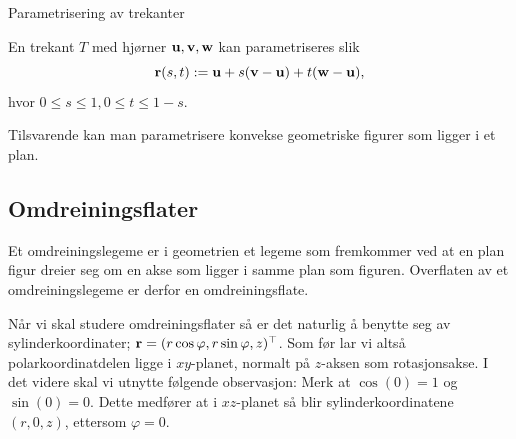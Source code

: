 \begin{eks}{Parametrisering av trekanter}\mbox{}\label{ex:trekant_para}\\
\begin{minipage}{7cm}
En trekant $T$ med hjørner $\mathbf{u},\mathbf{v},\mathbf{w}$ kan parametriseres slik
\[\mathbf{r}(s,t):=\mathbf{u}+s(\mathbf{v}-\mathbf{u})+t(\mathbf{w}-\mathbf{u}),\]
hvor $ 0\leq s\leq 1, 0\leq t\leq 1-s$.

Tilsvarende kan man parametrisere konvekse geometriske figurer som ligger i et plan.
\end{minipage}
\begin{minipage}{7cm}
\end{minipage}
\end{eks}

\subsection{Omdreiningsflater}
Et omdreiningslegeme er i geometrien et legeme som fremkommer ved at en plan figur dreier seg om en akse som ligger i samme plan som figuren. Overflaten av et omdreiningslegeme er derfor en omdreiningsflate.

Når vi skal studere omdreiningsflater så er det naturlig å benytte seg av sylinderkoordinater; $\mathbf{r}=(r\cos \varphi ,r \sin \varphi ,z)^\top$. Som før lar vi altså polarkoordinatdelen ligge i $xy$-planet, normalt på $z$-aksen som rotasjonsakse. I det videre skal vi utnytte følgende observasjon: Merk at $\cos(0)=1$ og $\sin(0)=0$. Dette medfører at i $xz$-planet så blir sylinderkoordinatene $(r,0,z)$, ettersom $\varphi=0$. 

